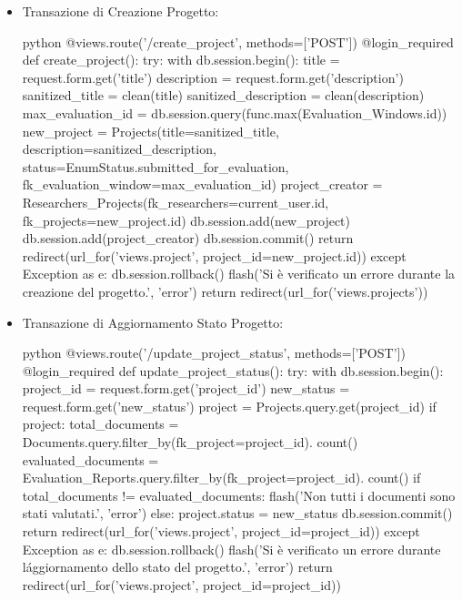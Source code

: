 \documentclass{report}
\begin{document}
\begin{itemize}
\item Transazione di Creazione Progetto:\\

\begin{minipage}{\linewidth}
\begin{imtaCode}{python}
@views.route('/create_project', methods=['POST'])
@login_required
def create_project():
    try:
        with db.session.begin():
            title = request.form.get('title')
            description = request.form.get('description')
            sanitized_title = clean(title)
            sanitized_description = clean(description)
            max_evaluation_id = db.session.query(func.max(Evaluation_Windows.id))
            new_project = Projects(title=sanitized_title, description=sanitized_description, status=EnumStatus.submitted_for_evaluation, fk_evaluation_window=max_evaluation_id)
            project_creator = Researchers_Projects(fk_researchers=current_user.id, fk_projects=new_project.id)
            db.session.add(new_project)
            db.session.add(project_creator)
        db.session.commit()      
        return redirect(url_for('views.project', project_id=new_project.id))
    except Exception as e:
        db.session.rollback()
        flash('Si è verificato un errore durante la creazione del progetto.', 'error')
        return redirect(url_for('views.projects'))
         \end{imtaCode}
\end{minipage}

\item Transazione di Aggiornamento Stato Progetto:\\


\begin{minipage}{\linewidth}
\begin{imtaCode}{python}
@views.route('/update_project_status', methods=['POST'])
@login_required
def update_project_status():
    try:
        with db.session.begin():
            project_id = request.form.get('project_id')
            new_status = request.form.get('new_status')
            project = Projects.query.get(project_id)
            if project:
                total_documents = Documents.query.filter_by(fk_project=project_id). count()
                evaluated_documents = Evaluation_Reports.query.filter_by(fk_project=project_id). count()
                if total_documents != evaluated_documents:
                    flash('Non tutti i documenti sono stati valutati.', 'error')
                else:
                    project.status = new_status
        db.session.commit()
        return redirect(url_for('views.project', project_id=project_id))
    except Exception as e:
        db.session.rollback()
        flash('Si è verificato un errore durante l\'aggiornamento dello stato del progetto.', 'error')
        return redirect(url_for('views.project', project_id=project_id))
         \end{imtaCode}
\end{minipage}


\end{itemize}
\end{document}
